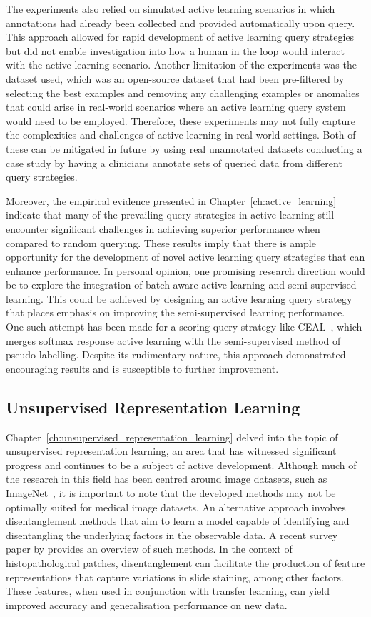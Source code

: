 The experiments also relied on simulated active learning scenarios in which annotations had already been collected and provided automatically upon query. This approach allowed for rapid development of active learning query strategies but did not enable investigation into how a human in the loop would interact with the active learning scenario. Another limitation of the experiments was the dataset used, which was an open-source dataset that had been pre-filtered by selecting the best examples and removing any challenging examples or anomalies that could arise in real-world scenarios where an active learning query system would need to be employed. Therefore, these experiments may not fully capture the complexities and challenges of active learning in real-world settings. Both of these can be mitigated in future by using real unannotated datasets conducting a case study by having a clinicians annotate sets of queried data from different query strategies.

Moreover, the empirical evidence presented in Chapter~\ref{ch:active_learning} indicate that many of the prevailing query strategies in active learning still encounter significant challenges in achieving superior performance when compared to random querying. These results imply that there is ample opportunity for the development of novel active learning query strategies that can enhance performance. In personal opinion, one promising research direction would be to explore the integration of batch-aware active learning and semi-supervised learning. This could be achieved by designing an active learning query strategy that places emphasis on improving the semi-supervised learning performance. One such attempt has been made for a scoring query strategy like CEAL~\citep{wang2016cost}, which merges softmax response active learning with the semi-supervised method of pseudo labelling. Despite its rudimentary nature, this approach demonstrated encouraging results and is susceptible to further improvement.


\subsection{Unsupervised Representation Learning}
Chapter~\ref{ch:unsupervised_representation_learning} delved into the topic of unsupervised representation learning, an area that has witnessed significant progress and continues to be a subject of active development. Although much of the research in this field has been centred around image datasets, such as ImageNet~\citep{deng2009imagenet}, it is important to note that the developed methods may not be optimally suited for medical image datasets. An alternative approach involves disentanglement methods that aim to learn a model capable of identifying and disentangling the underlying factors in the observable data. A recent survey paper by \cite{liu2022learning} provides an overview of such methods. In the context of histopathological patches, disentanglement can facilitate the production of feature representations that capture variations in slide staining, among other factors. These features, when used in conjunction with transfer learning, can yield improved accuracy and generalisation performance on new data.

